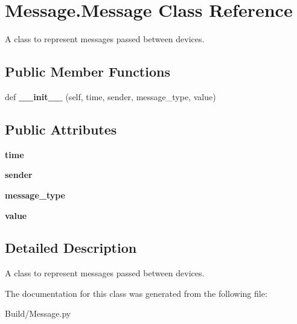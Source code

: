 \hypertarget{class_message_1_1_message}{}\section{Message.\+Message Class Reference}
\label{class_message_1_1_message}


A class to represent messages passed between devices.  


\subsection*{Public Member Functions}
\begin{DoxyCompactItemize}
\item 
\mbox{\label{class_message_1_1_message_a62fda57019b81f4ab2530c9b1cf9b363}} 
def {\bfseries \+\_\+\+\_\+init\+\_\+\+\_\+} (self, time, sender, message\+\_\+type, value)
\end{DoxyCompactItemize}
\subsection*{Public Attributes}
\begin{DoxyCompactItemize}
\item 
\mbox{\label{class_message_1_1_message_a5c41eff29d23d4a89f4ff32e6d2ee1f0}} 
{\bfseries time}
\item 
\mbox{\label{class_message_1_1_message_aac5c3be100e21c16277823abd73f1efa}} 
{\bfseries sender}
\item 
\mbox{\label{class_message_1_1_message_a903b0cd428b5718873b4500635ca93fb}} 
{\bfseries message\+\_\+type}
\item 
\mbox{\label{class_message_1_1_message_a1b7415657dc4705dc68e94b1417e963b}} 
{\bfseries value}
\end{DoxyCompactItemize}


\subsection{Detailed Description}
A class to represent messages passed between devices. 



The documentation for this class was generated from the following file\+:\begin{DoxyCompactItemize}
\item 
Build/Message.\+py\end{DoxyCompactItemize}

